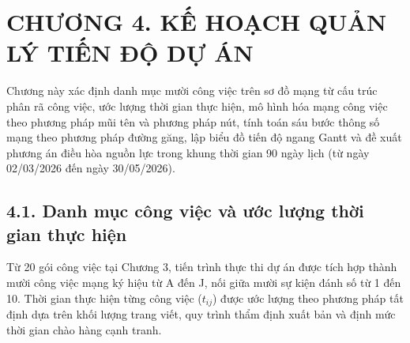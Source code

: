 \section*{CHƯƠNG 4. KẾ HOẠCH QUẢN LÝ TIẾN ĐỘ DỰ ÁN}

Chương này xác định danh mục mười công việc trên sơ đồ mạng từ cấu trúc phân rã công việc, ước lượng thời gian thực hiện, mô hình hóa mạng công việc theo phương pháp mũi tên và phương pháp nút, tính toán sáu bước thông số mạng theo phương pháp đường găng, lập biểu đồ tiến độ ngang Gantt và đề xuất phương án điều hòa nguồn lực trong khung thời gian 90 ngày lịch (từ ngày 02/03/2026 đến ngày 30/05/2026).

\subsection*{4.1. Danh mục công việc và ước lượng thời gian thực hiện}

Từ 20 gói công việc tại Chương 3, tiến trình thực thi dự án được tích hợp thành mười công việc mạng ký hiệu từ A đến J, nối giữa mười sự kiện đánh số từ 1 đến 10. Thời gian thực hiện từng công việc ($t_{ij}$) được ước lượng theo phương pháp tất định dựa trên khối lượng trang viết, quy trình thẩm định xuất bản và định mức thời gian chào hàng cạnh tranh.

